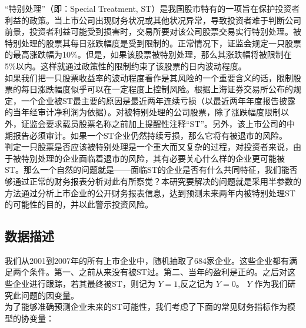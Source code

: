 \documentclass[a4paper,UTF8]{article}
\begin{document}
“特别处理”（即：Special Treatment, ST）是我国股市特有的一项旨在保护投资者利益的政策。当上市公司出现财务状况或其他状况异常，导致投资者难于判断公司前景，投资者利益可能受到损害时，交易所要对该公司股票交易实行特别处理。被特别处理的股票其每日涨跌幅度是受到限制的。正常情况下，证监会规定一只股票的最高涨跌幅为10\%。但是，如果该股票被特别处理，那么其涨跌幅将被限制在5\%以内。这样就通过政策性的限制约束了该股票的日内波动程度。\\

如果我们把一只股票收益率的波动程度看作是其风险的一个重要含义的话，限制股票的每日涨跌幅度似乎可以在一定程度上控制风险。根据上海证券交易所公布的规定，一个企业被ST最主要的原因是最近两年连续亏损（以最近两年年度报告披露的当年经审计净利润为依据）。对被特别处理的公司股票，除了涨跌幅度限制以外，证监会要求载员股票名称之前加上提醒性注释“ST”。另外，该上市公司的中期报告必须审计。如果一个ST企业仍然持续亏损，那么它将有被退市的风险。\\


判定一只股票是否应该被特别处理是一个重大而又复杂的过程，对投资者来说，由于被特别处理的企业面临着退市的风险，其有必要关心什么样的企业更可能被ST。那么一个自然的问题就是——面临ST的企业是否有什么共同特征，我们能否够通过正常的财务报表分析对此有所察觉？本研究要解决的问题就是采用半参数的方法通过分析上市企业的公开财务报表信息，达到预测未来两年内被特别处理ST的可能性的目的，并以此警示投资风险。
\subsection{数据描述}
我们从2001到2007年的所有上市企业中，随机抽取了684家企业。这些企业都有满足两个条件。第一、之前从来没有被ST过。第二、当年的盈利是正的。之后对这些企业进行跟踪，若其最终被ST，则记为 $Y=1$,反之记为 $Y=0$。 $Y$ 作为我们研究此问题的因变量。\\

为了能够准确预测企业未来的ST可能性，我们考虑了下面的常见财务指标作为模型的协变量：
\end{document}
